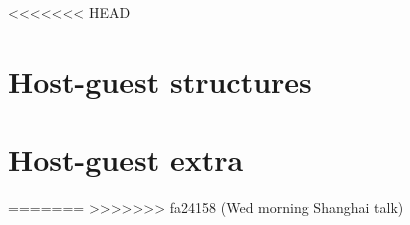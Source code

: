 <<<<<<< HEAD

\section{Host-guest structures}

\section{Host-guest extra}


=======
>>>>>>> fa24158 (Wed morning Shanghai talk)


% 


% 
% 

% 


% 


% 




